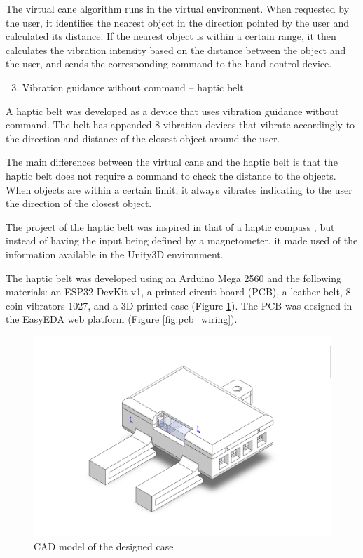         The virtual cane algorithm runs in the virtual environment. When requested by the user, it identifies the nearest object in the direction pointed by the user and calculated its distance. If the nearest object is within a certain range, it then calculates the vibration intensity based on the distance between the object and the user, and sends the corresponding command to the hand-control device.

        \begin{enumerate} [label = \Alph*)]
            \setcounter{enumi}{2}
            \item Vibration guidance without command – haptic belt
        \end{enumerate}

        A haptic belt was developed as a device that uses vibration guidance without command. The belt has appended 8 vibration devices that vibrate accordingly to the direction and distance of the closest object around the user. 

        The main differences between the virtual cane and the haptic belt is that the haptic belt does not require a command to check the distance to the objects. When objects are within a certain limit, it always vibrates indicating to the user the direction of the closest object. 

        The project of the haptic belt was inspired in that of a haptic compass \cite{kylecorry31_instructables_2020}, but instead of having the input being defined by a magnetometer, it made used of the information available in the Unity3D environment.

        The haptic belt was developed using an Arduino Mega 2560 and the following materials: an ESP32 DevKit v1, a printed circuit board (PCB), a leather belt, 8 coin vibrators 1027, and a 3D printed case (Figure \ref{fig:case_cinto}). The PCB was designed in the EasyEDA web platform (Figure \ref{fig:pcb_wiring}). 

        \begin{figure}[!htb]
            \centering
            \includegraphics[width = 0.8\linewidth]{Metodologia/Case Cinto.png}
            \caption{CAD model of the designed case}
            \label{fig:case_cinto}
        \end{figure}

